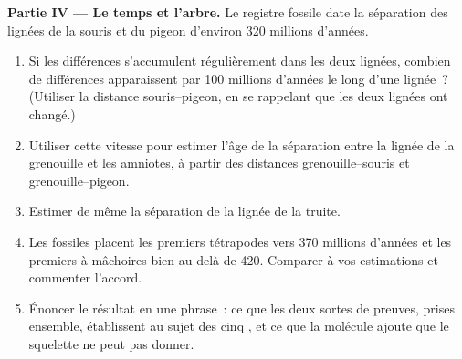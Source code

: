 \begin{problem}
\medskip
\noindent\textbf{Partie IV --- Le temps et l'arbre.}
Le registre fossile date la séparation des lignées de la souris et du
pigeon d'environ 320 millions d'années.
\begin{enumerate}[resume]
  \item Si les différences s'accumulent régulièrement dans les deux
        lignées, combien de différences apparaissent par 100 millions
        d'années le long d'une lignée~? (Utiliser la distance
        souris--pigeon, en se rappelant que les deux lignées ont
        changé.)
  \item Utiliser cette vitesse pour estimer l'âge de la séparation
        entre la lignée de la grenouille et les amniotes, à partir des
        distances grenouille--souris et grenouille--pigeon.
  \item Estimer de même la séparation de la lignée de la truite.
  \item Les fossiles placent les premiers tétrapodes vers 370 millions
        d'années et les premiers  à mâchoires bien au-delà de
        420. Comparer à vos estimations et commenter l'accord.
  \item Énoncer le résultat en une phrase~: ce que les deux sortes de
        preuves, prises ensemble, établissent au sujet des cinq
        , et ce que la molécule ajoute que le squelette ne peut
        pas donner.
\end{enumerate}
\end{problem}
